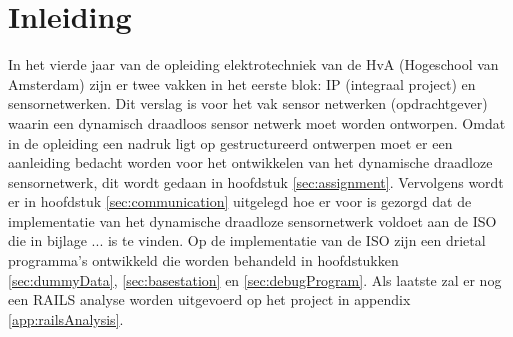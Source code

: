 \section{Inleiding}

In het vierde jaar van de opleiding elektrotechniek van de HvA (Hogeschool van Amsterdam) zijn er twee vakken in het eerste blok: IP (integraal project) en sensornetwerken. Dit verslag is voor het vak sensor netwerken (opdrachtgever) waarin een dynamisch draadloos sensor netwerk moet worden ontworpen. Omdat in de opleiding een nadruk ligt op gestructureerd ontwerpen moet er een aanleiding bedacht worden voor het ontwikkelen van het dynamische draadloze sensornetwerk, dit wordt gedaan in hoofdstuk \ref{sec:assignment}. Vervolgens wordt er in hoofdstuk \ref{sec:communication} uitgelegd hoe er voor is gezorgd dat de implementatie van het dynamische draadloze sensornetwerk voldoet aan de ISO die in bijlage ...  is te vinden. Op de implementatie van de ISO zijn een drietal programma's ontwikkeld die worden behandeld in hoofdstukken \ref{sec:dummyData}, \ref{sec:basestation} en \ref{sec:debugProgram}. Als laatste zal er nog een RAILS analyse worden uitgevoerd op het project in appendix \ref{app:railsAnalysis}.